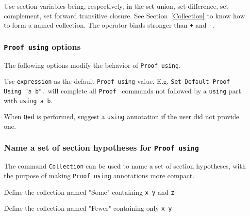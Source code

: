   Use section variables being, respectively, in the set union, set difference,
  set complement, set forward transitive closure.
  See Section~\ref{Collection} to know how to form a named
  collection.
  The {\tt *} operator binds stronger than {\tt +} and {\tt -}.

\subsubsection{{\tt Proof using} options}

The following options modify the behavior of {\tt Proof using}.


  Use {\tt expression} as the default {\tt Proof using} value.
  E.g. {\tt Set Default Proof Using "a b".} will complete all {\tt Proof }
  commands not followed by a {\tt using} part with {\tt using a b}.


  When {\tt Qed} is performed, suggest a {\tt using} annotation if
  the user did not provide one.

% 
% 
\subsubsection[\tt Collection]{Name a set of section hypotheses for {\tt Proof using}}
\label{Collection}

The command {\tt Collection} can be used to name a set of section hypotheses,
with the purpose of making {\tt Proof using} annotations more compact.


  Define the collection named "Some" containing {\tt x y} and {\tt z} 

  
  Define the collection named "Fewer" containing only {\tt x y} 

  
